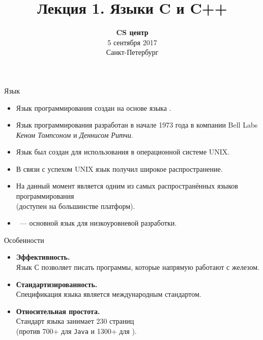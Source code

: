 \documentclass[aspectration=1610,t]{beamer}
\title{Лекция 1. Языки C и C++}
\date{
   \textbf{CS центр}\\
   5 сентября 2017\\
   Санкт-Петербург
}
\begin{document}
\begin{frame} 
  \titlepage
\end{frame}

\begin{frame}[fragile]{Язык \langc}
    \begin{itemize}
        \item Язык программирования \langcpp создан на основе языка \langc.

        \item 
            Язык программирования \langc разработан в начале 1973 года в 
            компании Bell Labs {\em Кеном Томпсоном} и {\em Деннисом Ритчи}.

        \item            
            Язык \langc был создан для использования в операционной системе UNIX.

        \item
            В связи с успехом UNIX язык \langc получил широкое
            распространение. 
            
        \item 
            На данный момент \langc является одним из самых распространённых языков
            программирования\\ (доступен на большинстве платформ).
                
        \item \langc~--- основной язык для низкоуровневой разработки.
    \end{itemize}
\end{frame}

\begin{frame}{Особенности \langc}
    \begin{itemize}
        \item {\bf Эффективность.}\\
            Язык С позволяет писать программы, которые напрямую работают с железом. 

        \item {\bf Стандартизированность.}\\
            Спецификация языка \langc является международным стандартом.
        
        \item {\bf Относительная простота.}\\
            Стандарт языка \langc занимает 230 страниц\\
            (против 700+ для \texttt{Java} и 1300+ для \langcpp).
    \end{itemize}
\end{frame}
\end{document}
